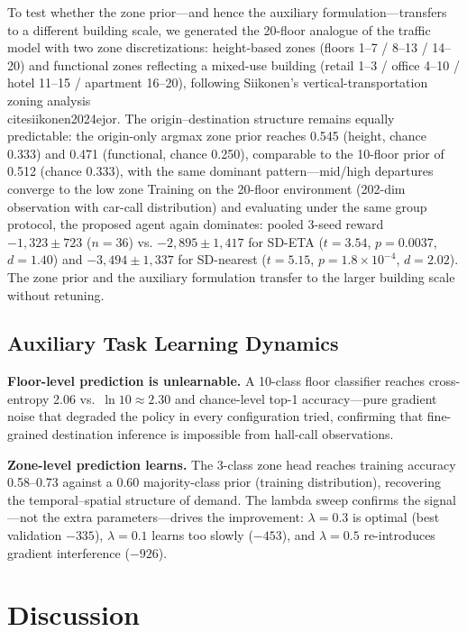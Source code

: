 \documentclass{IEEEcsmag}
\begin{document}
To test whether the zone prior---and hence the auxiliary
formulation---transfers to a different building scale, we generated
the 20-floor analogue of the traffic model with two zone
discretizations: height-based zones (floors 1--7 / 8--13 / 14--20)
and functional zones reflecting a mixed-use building (retail
1--3 / office 4--10 / hotel 11--15 / apartment 16--20), following
Siikonen's vertical-transportation zoning analysis~\\cite{siikonen2024ejor}.
The origin--destination structure remains equally predictable:
the origin-only argmax zone prior reaches 0.545 (height, chance
0.333) and 0.471 (functional, chance 0.250), comparable to the
10-floor prior of 0.512 (chance 0.333), with the same dominant
pattern---mid/high departures converge to the low zone
Training on the 20-floor
environment (202-dim observation with car-call distribution) and
evaluating under the same group protocol, the proposed agent again
dominates: pooled 3-seed reward $-1{,}323 \pm 723$ ($n = 36$) vs.
$-2{,}895 \pm 1{,}417$ for SD-ETA ($t = 3.54$, $p = 0.0037$,
$d = 1.40$) and $-3{,}494 \pm 1{,}337$ for SD-nearest ($t = 5.15$,
$p = 1.8\times10^{-4}$, $d = 2.02$). The zone prior and the
auxiliary formulation transfer to the larger building scale without
retuning.
\subsection{Auxiliary Task Learning Dynamics}

\textbf{Floor-level prediction is unlearnable.} A 10-class floor
classifier reaches cross-entropy 2.06 vs.~$\ln 10 \approx 2.30$ and
chance-level top-1 accuracy---pure gradient noise that degraded the
policy in every configuration tried, confirming that fine-grained
destination inference is impossible from hall-call observations.

\textbf{Zone-level prediction learns.} The 3-class zone head reaches
training accuracy 0.58--0.73 against a 0.60 majority-class prior
(training distribution), recovering the temporal--spatial structure
of demand. The lambda
sweep confirms the signal---not the extra parameters---drives the
improvement: $\lambda = 0.3$ is optimal (best validation $-335$),
$\lambda = 0.1$ learns too slowly ($-453$), and $\lambda = 0.5$
re-introduces gradient interference ($-926$).

\section{Discussion}
\end{document}
